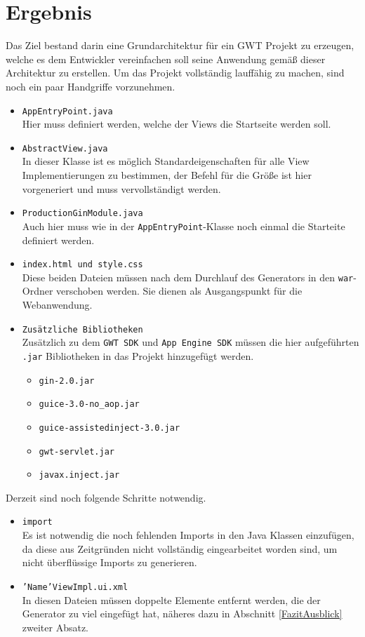 \chapter{Ergebnis} \label{Ergebnis}
Das Ziel bestand darin eine Grundarchitektur für ein GWT Projekt zu erzeugen,
welche es dem Entwickler vereinfachen soll seine Anwendung gemäß dieser
Architektur zu erstellen. Um das Projekt vollständig lauffähig zu machen, sind
noch ein paar Handgriffe vorzunehmen.

\begin{itemize}
  \item \texttt{AppEntryPoint.java} \\
  Hier muss definiert werden, welche der Views die Startseite werden soll.
  \item \texttt{AbstractView.java} \\
  In dieser Klasse ist es möglich Standardeigenschaften für alle View
  Implementierungen zu bestimmen, der Befehl für die Größe ist hier
  vorgeneriert und muss vervollständigt werden.
  \item \texttt{ProductionGinModule.java} \\
  Auch hier muss wie in der \texttt{AppEntryPoint}-Klasse noch einmal die
  Starteite definiert werden.
  \item \texttt{index.html und style.css} \\
  Diese beiden Dateien müssen nach dem Durchlauf des Generators in den
  \texttt{war}-Ordner verschoben werden. Sie dienen als Ausgangspunkt für die
  Webanwendung.
  \item \texttt{Zusätzliche Bibliotheken}\\
  	Zusätzlich zu dem \texttt{GWT SDK} und \texttt{App Engine SDK} müssen die
    hier aufgeführten \texttt{.jar} Bibliotheken in das Projekt hinzugefügt
    werden.
  	\begin{itemize}
  	  \item \texttt{gin-2.0.jar}
  	  \item \texttt{guice-3.0-no\_aop.jar}
  	  \item \texttt{guice-assistedinject-3.0.jar}
  	  \item \texttt{gwt-servlet.jar}
  	  \item \texttt{javax.inject.jar}
	\end{itemize}
\end{itemize}
Derzeit sind noch folgende Schritte notwendig.
\begin{itemize}
  \item \texttt{import} \\
  Es ist notwendig die noch fehlenden Imports in den Java Klassen
  einzufügen, da diese aus Zeitgründen nicht vollständig eingearbeitet
  worden sind, um nicht überflüssige Imports zu generieren. 
  \item \texttt{'Name'ViewImpl.ui.xml} \\
  In diesen Dateien müssen doppelte Elemente entfernt werden, die der Generator zu
  viel eingefügt hat, näheres dazu in Abschnitt \ref{FazitAusblick} zweiter
  Absatz.
\end{itemize} 

